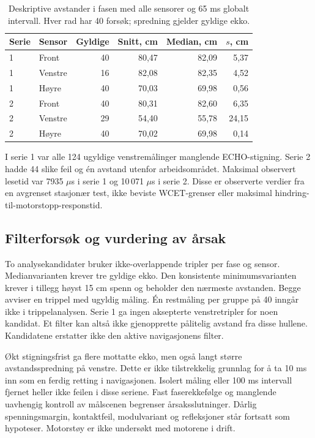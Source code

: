 \begin{table}[htbp]
\centering\small
\caption{Deskriptive avstander i fasen med alle sensorer og 65 ms
globalt intervall. Hver rad har 40 forsøk; spredning gjelder gyldige ekko.}
\begin{tabular}{llrrrr}\toprule
Serie & Sensor & Gyldige & Snitt, cm & Median, cm & \(s\), cm \\\midrule
1&Front&40&80,47&82,09&5,37\\
1&Venstre&16&82,08&82,35&4,52\\
1&Høyre&40&70,03&69,98&0,56\\
2&Front&40&80,31&82,60&6,35\\
2&Venstre&29&54,40&55,78&24,15\\
2&Høyre&40&70,02&69,98&0,14\\\bottomrule
\end{tabular}
\end{table}

I serie 1 var alle 124 ugyldige venstremålinger manglende ECHO-stigning.
Serie 2 hadde 44 slike feil og én avstand utenfor arbeidsområdet.
Maksimal observert lesetid var 7935 \(\mu\)s i serie 1 og
10\,071 \(\mu\)s i serie 2. Disse er observerte verdier fra en avgrenset
stasjonær test, ikke beviste WCET-grenser eller maksimal
hindring-til-motorstopp-responstid.

\subsection{Filterforsøk og vurdering av årsak}
To analysekandidater bruker ikke-overlappende tripler per fase og sensor.
Medianvarianten krever tre gyldige ekko. Den konsistente
minimumsvarianten krever i tillegg høyst 15 cm spenn og beholder den
nærmeste avstanden. Begge avviser en trippel med ugyldig måling.
Én restmåling per gruppe på 40 inngår ikke i trippelanalysen.
Serie 1 ga ingen aksepterte venstretripler for noen kandidat. Et filter
kan altså ikke gjenopprette pålitelig avstand fra disse hullene.
Kandidatene erstatter ikke den aktive navigasjonens filter.

Økt stigningsfrist ga flere mottatte ekko, men også langt større
avstandsspredning på venstre. Dette er ikke tilstrekkelig grunnlag for
å ta 10 ms inn som en ferdig retting i navigasjonen. Isolert måling
eller 100 ms intervall fjernet heller ikke feilen i disse seriene.
Fast faserekkefølge og manglende uavhengig kontroll av målscenen
begrenser årsaksslutninger. Dårlig spenningsmargin, kontaktfeil,
modulvariant og refleksjoner står fortsatt som
hypoteser. Motorstøy er ikke undersøkt med motorene i drift.

